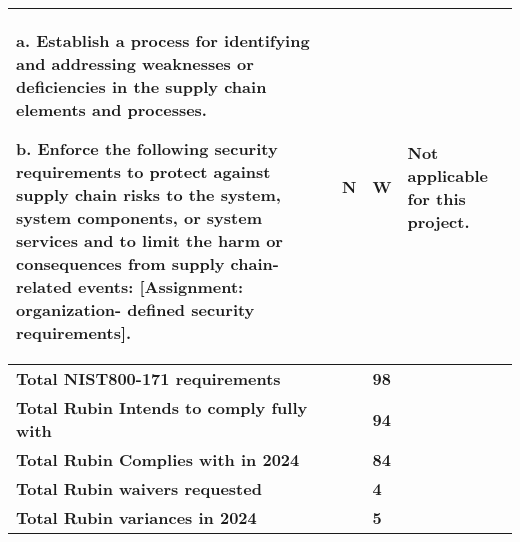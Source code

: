 \begin{longtable} {|p{}|p{}|p{}|p{} |}
{a. Establish a process for identifying and addressing weaknesses or deficiencies in the supply chain elements and processes.

b. Enforce the following security requirements to protect against supply chain risks to the system, system components, or system services and to limit the harm or consequences from supply chain-related events: [Assignment: organization- defined security requirements].}&{N}&{W}&{Not applicable for this project.} \\ \hline
\textbf{Total NIST800-171 requirements}&\textbf{}&\textbf{98}& \\ \hline
\textbf{Total Rubin Intends to comply fully with }&\textbf{}&\textbf{94}& \\ \hline
\textbf{Total Rubin Complies with in 2024}&\textbf{}&\textbf{84}& \\ \hline
\textbf{Total Rubin waivers requested }&\textbf{}&\textbf{4}& \\ \hline
\textbf{Total Rubin variances in 2024}&\textbf{}&\textbf{5}& \\ \hline
\end{longtable} \normalsize
